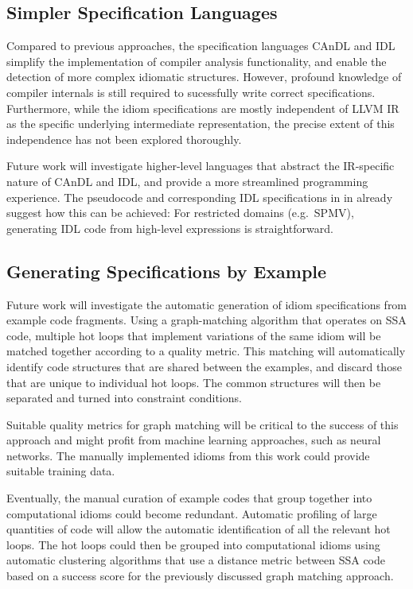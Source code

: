 \subsection*{Simpler Specification Languages}

    Compared to previous approaches, the specification languages CAnDL and IDL
    simplify the implementation of compiler analysis functionality, and enable
    the detection of more complex idiomatic structures.
    However, profound knowledge of compiler internals is still required to
    sucessfully write correct specifications.
    Furthermore, while the idiom specifications are mostly independent of
    LLVM IR as the specific underlying intermediate representation, the precise
    extent of this independence has not been explored thoroughly.

    Future work will investigate higher-level languages that abstract the
    IR-specific nature of CAnDL and IDL, and provide a more streamlined
    programming experience.
    The pseudocode and corresponding IDL specifications in
     in  already
    suggest how this can be achieved:
    For restricted domains (e.g.\ SPMV), generating IDL code from high-level
    expressions is straightforward.

\subsection*{Generating Specifications by Example}

    Future work will investigate the automatic generation of idiom
    specifications from example code fragments.
    Using a graph-matching algorithm that operates on SSA code, multiple hot
    loops that implement variations of the same idiom will be matched together
    according to a quality metric.
    This matching will automatically identify code structures that are shared
    between the examples, and discard those that are unique to individual hot
    loops.
    The common structures will then be separated and turned into constraint
    conditions.

    Suitable quality metrics for graph matching will be critical to the success
    of this approach and might profit from machine learning approaches, such as
    neural networks.
    The manually implemented idioms from this work could provide suitable
    training data.

    Eventually, the manual curation of example codes that group together into
    computational idioms could become redundant.
    Automatic profiling of large quantities of code will allow the automatic
    identification of all the relevant hot loops.
    The hot loops could then be grouped into computational idioms using
    automatic clustering algorithms that use a distance metric between SSA code
    based on a success score for the previously discussed graph matching
    approach.
